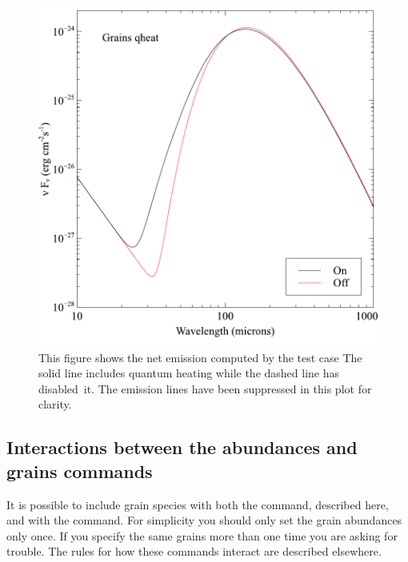 \begin{figure}
\centering
\includegraphics{grains_qheat}
\caption[Quantum heating]{\label{fig:grains_qheat}This figure shows the
net emission computed by the test case
The solid line includes quantum heating while the dashed
line has disabled~it. The emission lines have been suppressed in this plot for clarity.}
\end{figure}

\subsection{Interactions between the abundances and grains commands}

It is possible to include grain species with both the
 command,
described here, and with the  command.
For simplicity you should only set the grain abundances
only once.
If you specify the same grains more than one time you are asking
for trouble.
The rules for how these commands interact are described elsewhere.

